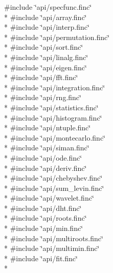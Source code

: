 {\ttfamily \#include \char`\"{}api/specfunc.\+finc\char`\"{}}\\*
{\ttfamily \#include \char`\"{}api/array.\+finc\char`\"{}}\\*
{\ttfamily \#include \char`\"{}api/interp.\+finc\char`\"{}}\\*
{\ttfamily \#include \char`\"{}api/permutation.\+finc\char`\"{}}\\*
{\ttfamily \#include \char`\"{}api/sort.\+finc\char`\"{}}\\*
{\ttfamily \#include \char`\"{}api/linalg.\+finc\char`\"{}}\\*
{\ttfamily \#include \char`\"{}api/eigen.\+finc\char`\"{}}\\*
{\ttfamily \#include \char`\"{}api/fft.\+finc\char`\"{}}\\*
{\ttfamily \#include \char`\"{}api/integration.\+finc\char`\"{}}\\*
{\ttfamily \#include \char`\"{}api/rng.\+finc\char`\"{}}\\*
{\ttfamily \#include \char`\"{}api/statistics.\+finc\char`\"{}}\\*
{\ttfamily \#include \char`\"{}api/histogram.\+finc\char`\"{}}\\*
{\ttfamily \#include \char`\"{}api/ntuple.\+finc\char`\"{}}\\*
{\ttfamily \#include \char`\"{}api/montecarlo.\+finc\char`\"{}}\\*
{\ttfamily \#include \char`\"{}api/siman.\+finc\char`\"{}}\\*
{\ttfamily \#include \char`\"{}api/ode.\+finc\char`\"{}}\\*
{\ttfamily \#include \char`\"{}api/deriv.\+finc\char`\"{}}\\*
{\ttfamily \#include \char`\"{}api/chebyshev.\+finc\char`\"{}}\\*
{\ttfamily \#include \char`\"{}api/sum\+\_\+levin.\+finc\char`\"{}}\\*
{\ttfamily \#include \char`\"{}api/wavelet.\+finc\char`\"{}}\\*
{\ttfamily \#include \char`\"{}api/dht.\+finc\char`\"{}}\\*
{\ttfamily \#include \char`\"{}api/roots.\+finc\char`\"{}}\\*
{\ttfamily \#include \char`\"{}api/min.\+finc\char`\"{}}\\*
{\ttfamily \#include \char`\"{}api/multiroots.\+finc\char`\"{}}\\*
{\ttfamily \#include \char`\"{}api/multimin.\+finc\char`\"{}}\\*
{\ttfamily \#include \char`\"{}api/fit.\+finc\char`\"{}}\\*
